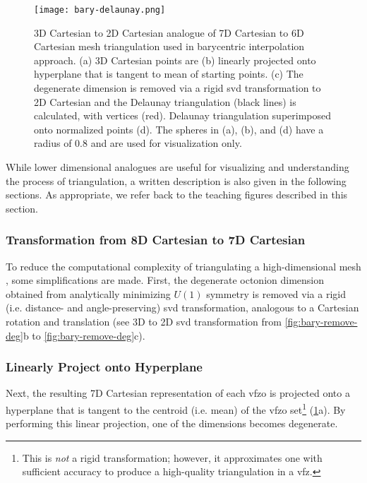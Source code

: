 \documentclass[final,twocolumn,12pt]{elsarticle}
\begin{document}
\begin{appendices}
\begin{figure}
    \centering
    \texttt{[image: bary-delaunay.png]}
    \caption{3D Cartesian to 2D Cartesian analogue of 7D Cartesian to 6D Cartesian mesh triangulation used in barycentric interpolation approach. (a) 3D Cartesian \inpt{} points are (b) linearly projected onto hyperplane that is tangent to mean of starting points. (c) The degenerate dimension is removed via a rigid \gls{svd} transformation to 2D Cartesian and the Delaunay triangulation (black lines) is calculated, with \inpt{} vertices (red). Delaunay triangulation superimposed onto normalized \inpt{} points (d). The spheres in (a), (b), and (d) have a radius of 0.8 and are used for visualization only.}
    \label{fig:bary-delaunay}
\end{figure}

While lower dimensional analogues are useful for visualizing and understanding the process of triangulation, a written description is also given in the following sections. As appropriate, we refer back to the teaching figures described in this section.

\subsubsection{ Transformation from 8D Cartesian to 7D Cartesian}
\label{sec:app:bary:tri:svd1}
 To reduce the computational complexity of triangulating a high-dimensional mesh \cite{barberQuickhullAlgorithmConvex1996}, some simplifications are made. First, the degenerate octonion dimension obtained from analytically minimizing $U(1)$ symmetry \cite{francisGeodesicOctonionMetric2019} is removed via a rigid (i.e. distance- and angle-preserving) \gls{svd} transformation,
analogous to a Cartesian rotation and translation (see 3D to 2D \gls{svd} transformation from \cref{fig:bary-remove-deg}b to \cref{fig:bary-remove-deg}c).

\subsubsection{Linearly Project onto Hyperplane}
\label{sec:app:bary:tri:project}
Next, the resulting 7D Cartesian representation of each \gls{vfzo} is projected onto a hyperplane that is tangent to the centroid (i.e. mean) of the \gls{vfzo} set\footnote{This is \textit{not} a rigid transformation; however, it approximates one with sufficient accuracy to produce a high-quality triangulation in a \gls{vfz}.} (\cref{fig:bary-delaunay}a). By performing this linear projection, one of the dimensions becomes degenerate.


\end{appendices}
\end{document}
